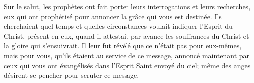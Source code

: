 Sur le salut,
		les prophètes ont fait porter leurs interrogations et leurs recherches,
	eux qui ont prophétisé pour annoncer la grâce qui vous est destinée.
Ils cherchaient quel temps et quelles circonstances
		voulait indiquer l’Esprit du Christ, présent en eux,
	quand il attestait par avance les souffrances du Christ
	et la gloire qui s’ensuivrait.
Il leur fut révélé que ce n’était pas pour eux-mêmes, mais pour vous,
	qu’ils étaient au service de ce message,
	annoncé maintenant par ceux qui vous ont évangélisés
		dans l’Esprit Saint envoyé du ciel;
	même des anges désirent se pencher pour scruter ce message.
